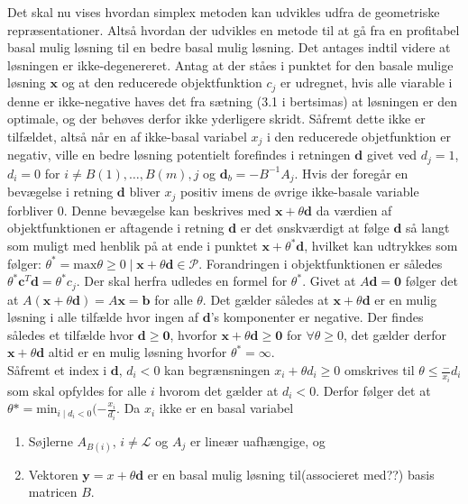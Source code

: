 
Det skal nu vises hvordan simplex metoden kan udvikles udfra de geometriske repræsentationer.
Altså hvordan der udvikles en metode til at gå fra en profitabel basal mulig løsning til en bedre basal mulig løsning.
Det antages indtil videre at løsningen er ikke-degenereret.
Antag at der ståes i punktet for den basale mulige løsning $\mathbf{x}$ og at den reducerede objektfunktion $c_j$ er udregnet, hvis alle viarable i denne er ikke-negative haves det fra sætning (3.1 i bertsimas) at løsningen er den optimale, og der behøves derfor ikke yderligere skridt.
Såfremt dette ikke er tilfældet, altså når en af ikke-basal variabel $x_j$ i den reducerede objetfunktion er negativ, ville en bedre løsning potentielt forefindes i retningen $\mathbf{d}$ givet ved  $d_j=1$, $d_i=0$ for $i \neq B(1),\ldots,B(m),j$ og $\mathbf{d}_b=-B^{-1}A_j$.
Hvis der foregår en bevægelse i retning $\mathbf{d}$ bliver $x_j$ positiv imens de øvrige ikke-basale variable forbliver $0$.
Denne bevægelse kan beskrives med $\mathbf{x}+\theta \mathbf{d}$ da værdien af objektfunktionen er aftagende i retning $\mathbf{d}$ er det ønskværdigt at følge $\mathbf{d}$ så langt som muligt med henblik på at ende i punktet $\mathbf{x}+\theta^{*} \mathbf{d}$, hvilket kan udtrykkes som følger: $\theta^{*}=\text{max} \theta \geq 0 \mid \mathbf{x}+\theta \mathbf{d} \in \mathcal{P}$.
Forandringen i objektfunktionen er således $\theta^{*}\mathbf{c}^T \mathbf{d}=\theta^{*}c_j$.
Der skal herfra udledes en formel for $\theta^{*}$.
Givet at $A\mathbf{d}=\mathbf{0}$ følger det at $A(\mathbf{x}+\theta \mathbf{d})=A\mathbf{x}=\mathbf{b}$ for alle $\theta$.
Det gælder således at $\mathbf{x}+\theta\mathbf{d}$ er en mulig løsning i alle tilfælde hvor ingen af $\mathbf{d}$'s komponenter er negative.
Der findes således et tilfælde hvor $\mathbf{d} \geq \mathbf{0}$, hvorfor $\mathbf{x} + \theta \mathbf{d} \geq \mathbf{0}$ for $\forall\theta \geq 0$, det gælder derfor $\mathbf{x} + \theta \mathbf{d} $ altid er en mulig løsning hvorfor $\theta^*=\infty$. \\
Såfremt et index i $\mathbf{d}$, $d_i<0$ kan begrænsningen $x_i + \theta d_i \geq 0$ omskrives til $\theta \leq \frac-{x_i}{d_i}$ som skal opfyldes for alle $i$ hvorom det gælder at $d_i<0$.
Derfor følger det at $\theta*=\text{min}_{i \mid d_i<0}(-\frac{x_i}{d_i}$.
Da $x_i$ ikke er en basal variabel 
\begin{thm}{}{}
\begin{enumerate}[label = (\alph*)]
\item Søjlerne $A_{B(i)}$, $i \neq \mathcal{L}$ og $A_j$ er lineær uafhængige, og 
\item Vektoren $\mathbf{y}=x+ \theta \mathbf{d}$ er en basal mulig løsning til(associeret med??) basis matricen $B$.
\end{enumerate}
\end{thm}
